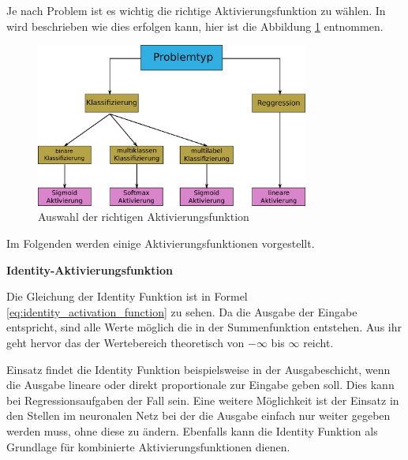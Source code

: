 
Je nach Problem ist es wichtig die richtige Aktivierungsfunktion zu wählen. In \cite{brownlee-2021} wird beschrieben wie dies erfolgen kann, hier ist die Abbildung \ref{img:selection_activation_function} entnommen.

\begin{figure}[!ht]
	\includegraphics[width=0.8\textwidth]{content/chapter_basics/images/activation_select.eps}
	\centering
	\caption{Auswahl der richtigen Aktivierungsfunktion}
	\label{img:selection_activation_function}
\end{figure}

Im Folgenden werden einige Aktivierungsfunktionen vorgestellt.\vspace{0.2cm}

%
\textbf{Identity-Aktivierungsfunktion}\vspace{0.2cm}

Die Gleichung der Identity Funktion ist in Formel \ref{eq:identity_activation_function} zu sehen. Da die Ausgabe der Eingabe entspricht, sind alle Werte möglich die in der Summenfunktion entstehen. Aus ihr geht hervor das der Wertebereich theoretisch von $-\infty$ bis $\infty$ reicht.\vspace{0.2cm}

Einsatz findet die Identity Funktion beispielsweise in der Ausgabeschicht, wenn die Ausgabe lineare oder direkt proportionale zur Eingabe geben soll. Dies kann bei Regressionsaufgaben der Fall sein. Eine weitere Möglichkeit ist der Einsatz in den Stellen im neuronalen Netz bei der die Ausgabe einfach nur weiter gegeben werden muss, ohne diese zu ändern. Ebenfalls kann die Identity Funktion als Grundlage für kombinierte Aktivierungsfunktionen dienen.

